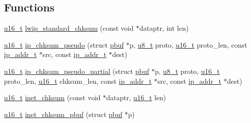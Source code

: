\subsection*{Functions}
\begin{DoxyCompactItemize}
\item 
\hyperlink{group__compiler__abstraction_ga77570ac4fcab86864fa1916e55676da2}{u16\+\_\+t} \hyperlink{openmote-cc2538_2lwip_2src_2core_2inet__chksum_8c_a4c8d40559878aa9bf6bfce8d8ab8a72b}{lwip\+\_\+standard\+\_\+chksum} (const void $\ast$dataptr, int len)
\item 
\hyperlink{group__compiler__abstraction_ga77570ac4fcab86864fa1916e55676da2}{u16\+\_\+t} \hyperlink{openmote-cc2538_2lwip_2src_2core_2inet__chksum_8c_aa13cda42e7c262f5dee243ff6c28422f}{ip\+\_\+chksum\+\_\+pseudo} (struct \hyperlink{structpbuf}{pbuf} $\ast$p, \hyperlink{group__compiler__abstraction_ga4caecabca98b43919dd11be1c0d4cd8e}{u8\+\_\+t} proto, \hyperlink{group__compiler__abstraction_ga77570ac4fcab86864fa1916e55676da2}{u16\+\_\+t} proto\+\_\+len, const \hyperlink{native_2lwip_2src_2include_2lwip_2ip__addr_8h_a88b43639738c4de2d3cd22e3a1fd7696}{ip\+\_\+addr\+\_\+t} $\ast$src, const \hyperlink{native_2lwip_2src_2include_2lwip_2ip__addr_8h_a88b43639738c4de2d3cd22e3a1fd7696}{ip\+\_\+addr\+\_\+t} $\ast$dest)
\item 
\hyperlink{group__compiler__abstraction_ga77570ac4fcab86864fa1916e55676da2}{u16\+\_\+t} \hyperlink{openmote-cc2538_2lwip_2src_2core_2inet__chksum_8c_acfe7ab6c63ef998210c66bb4822b03b2}{ip\+\_\+chksum\+\_\+pseudo\+\_\+partial} (struct \hyperlink{structpbuf}{pbuf} $\ast$p, \hyperlink{group__compiler__abstraction_ga4caecabca98b43919dd11be1c0d4cd8e}{u8\+\_\+t} proto, \hyperlink{group__compiler__abstraction_ga77570ac4fcab86864fa1916e55676da2}{u16\+\_\+t} proto\+\_\+len, \hyperlink{group__compiler__abstraction_ga77570ac4fcab86864fa1916e55676da2}{u16\+\_\+t} chksum\+\_\+len, const \hyperlink{native_2lwip_2src_2include_2lwip_2ip__addr_8h_a88b43639738c4de2d3cd22e3a1fd7696}{ip\+\_\+addr\+\_\+t} $\ast$src, const \hyperlink{native_2lwip_2src_2include_2lwip_2ip__addr_8h_a88b43639738c4de2d3cd22e3a1fd7696}{ip\+\_\+addr\+\_\+t} $\ast$dest)
\item 
\hyperlink{group__compiler__abstraction_ga77570ac4fcab86864fa1916e55676da2}{u16\+\_\+t} \hyperlink{openmote-cc2538_2lwip_2src_2core_2inet__chksum_8c_a34f1aa1587562a09e11b704b51bab043}{inet\+\_\+chksum} (const void $\ast$dataptr, \hyperlink{group__compiler__abstraction_ga77570ac4fcab86864fa1916e55676da2}{u16\+\_\+t} len)
\item 
\hyperlink{group__compiler__abstraction_ga77570ac4fcab86864fa1916e55676da2}{u16\+\_\+t} \hyperlink{openmote-cc2538_2lwip_2src_2core_2inet__chksum_8c_ab35967a50418358e194e8f80fdc3c865}{inet\+\_\+chksum\+\_\+pbuf} (struct \hyperlink{structpbuf}{pbuf} $\ast$p)
\end{DoxyCompactItemize}


